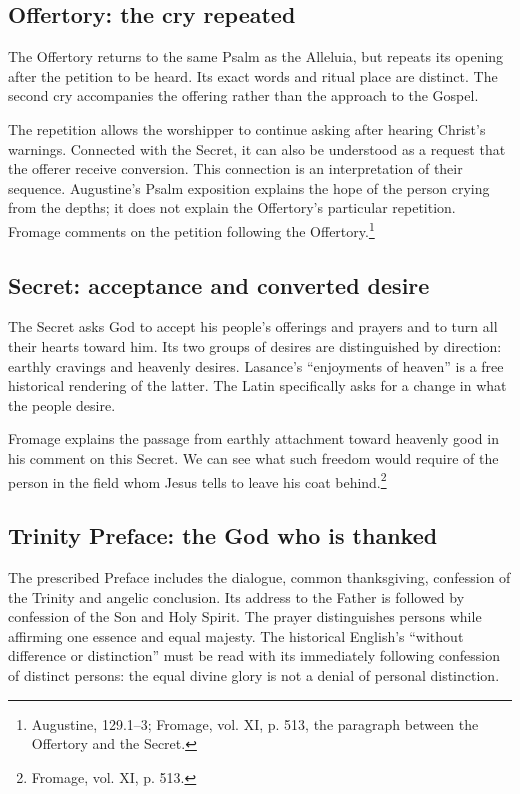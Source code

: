 \subsection{Offertory: the cry repeated}

The Offertory returns to the same Psalm as the Alleluia, but repeats its
opening after the petition to be heard. Its exact words and ritual place
are distinct. The second cry accompanies the offering rather than the
approach to the Gospel.

The repetition allows the worshipper to continue asking after hearing
Christ's warnings. Connected with the Secret, it can also be understood
as a request that the offerer receive conversion. This connection is
an interpretation of their sequence. Augustine's Psalm exposition
explains the hope of the person crying from the depths; it does not
explain the Offertory's particular repetition. Fromage comments on the
petition following the Offertory.\footnote{Augustine,
 129.1--3; Fromage, vol. XI, p. 513,
the paragraph between the Offertory and the Secret.}

\subsection{Secret: acceptance and converted desire}

The Secret asks God to accept his people's offerings and prayers and to
turn all their hearts toward him. Its two groups of desires are
distinguished by direction: earthly cravings and heavenly desires.
Lasance's ``enjoyments of heaven'' is a free historical rendering of
the latter. The Latin specifically asks for a change in what the
people desire.

Fromage explains the passage from earthly attachment toward heavenly
good in his comment on this Secret. We can see what such freedom would
require of the person in the field whom Jesus tells to leave his coat
behind.\footnote{Fromage, vol. XI, p. 513.}

\subsection{Trinity Preface: the God who is thanked}

The prescribed Preface includes the dialogue, common thanksgiving,
confession of the Trinity and angelic conclusion. Its address to
the Father is followed by confession of the Son and Holy Spirit.
The prayer distinguishes persons while affirming one essence and
equal majesty. The historical English's ``without difference or
distinction'' must be read with its immediately following confession
of distinct persons: the equal divine glory is not a denial of
personal distinction.

